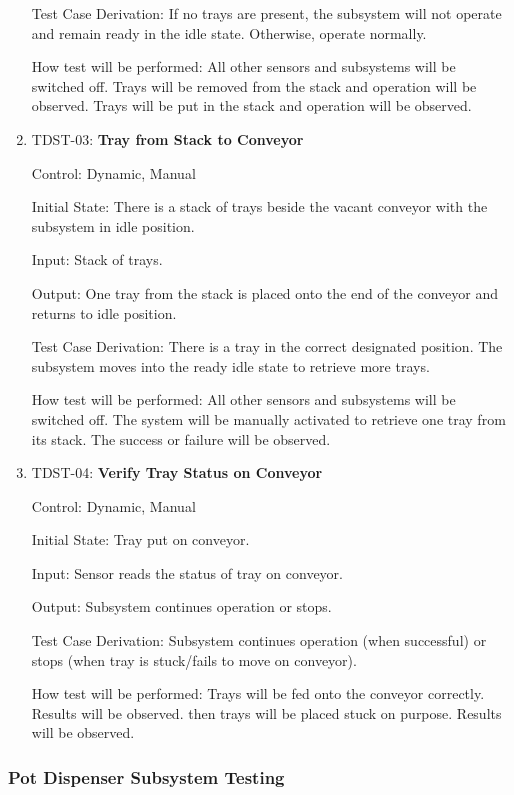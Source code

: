 \documentclass[12pt, titlepage]{article}
\begin{document}
\begin{enumerate}
  Test Case Derivation: If no trays are present, the subsystem will not operate 
  and remain ready in the idle state. Otherwise, operate normally.
  
  How test will be performed: All other sensors and subsystems will be switched off. 
  Trays will be removed from the stack and operation will be observed. Trays will be 
  put in the stack and operation will be observed.\\

  \item{TDST-03: \textbf{Tray from Stack to Conveyor}}
  
  Control: Dynamic, Manual
            
  Initial State: There is a stack of trays beside the vacant conveyor with the subsystem in idle position.
            
  Input: Stack of trays.
            
  Output: One tray from the stack is placed onto the end of the conveyor and returns to idle position.
  
  Test Case Derivation: There is a tray in the correct designated position.
  The subsystem moves into the ready idle state to retrieve more trays.
            
  How test will be performed: All other sensors and subsystems will be switched off. 
  The system will be manually activated to retrieve one tray from its stack.
  The success or failure will be observed.
\\
  \item{TDST-04: \textbf{Verify Tray Status on Conveyor}}
  
  Control: Dynamic, Manual
            
  Initial State: Tray put on conveyor.
            
  Input: Sensor reads the status of tray on conveyor.
            
  Output: Subsystem continues operation or stops.
  
  Test Case Derivation: Subsystem continues operation (when successful) or stops (when tray is stuck/fails to move on conveyor).
  
  How test will be performed: Trays will be fed onto the conveyor correctly. Results will be observed.
  then trays will be placed stuck on purpose. Results will be observed.
  
  \end{enumerate}

\subsubsection{Pot Dispenser Subsystem Testing}
\end{document}
